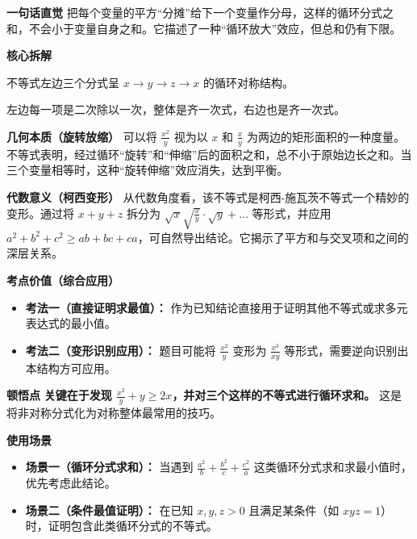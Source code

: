 \begin{explanationbox}
\textbf{\textcolor{CExplanation}{一句话直觉}}
把每个变量的平方“分摊”给下一个变量作分母，这样的循环分式之和，不会小于变量自身之和。它描述了一种“循环放大”效应，但总和仍有下限。

\medskip
\textbf{\textcolor{CExplanation}{核心拆解}}
\begin{description}[style=nextline, leftmargin=2.8em, labelsep=0.5em, itemsep=0.45em]
    \item[\textbf{要点一（结构对称）：}] 不等式左边三个分式呈 $x \to y \to z \to x$ 的循环对称结构。
    \item[\textbf{要点二（分式降幂）：}] 左边每一项是二次除以一次，整体是齐一次式，右边也是齐一次式。
\end{description}

\medskip
\textbf{\textcolor{CExplanation}{几何本质（旋转放缩）}}
可以将 $\frac{x^2}{y}$ 视为以 $x$ 和 $\frac{x}{y}$ 为两边的矩形面积的一种度量。不等式表明，经过循环“旋转”和“伸缩”后的面积之和，总不小于原始边长之和。当三个变量相等时，这种“旋转伸缩”效应消失，达到平衡。

\medskip
\textbf{\textcolor{CExplanation}{代数意义（柯西变形）}}
从代数角度看，该不等式是柯西-施瓦茨不等式一个精妙的变形。通过将 $x+y+z$ 拆分为 $\sqrt{x}\sqrt{\frac{x}{y}} \cdot \sqrt{y} + \dots$ 等形式，并应用 $a^2+b^2+c^2 \geq ab+bc+ca$，可自然导出结论。它揭示了平方和与交叉项和之间的深层关系。

\medskip
\textbf{\textcolor{CExplanation}{考点价值（综合应用）}}
\begin{itemize}[leftmargin=*, itemsep=0.5em, topsep=0.4em]
    \item \textbf{考法一（直接证明求最值）：} 作为已知结论直接用于证明其他不等式或求多元表达式的最小值。
    \item \textbf{考法二（变形识别应用）：} 题目可能将 $\frac{x^2}{y}$ 变形为 $\frac{x^3}{xy}$ 等形式，需要逆向识别出本结构方可应用。
\end{itemize}

\medskip
\textbf{\textcolor{CExplanation}{顿悟点}}
\textbf{关键在于发现 $\frac{x^2}{y} + y \geq 2x$，并对三个这样的不等式进行循环求和。} 这是将非对称分式化为对称整体最常用的技巧。

\medskip
\textbf{\textcolor{CExplanation}{使用场景}}
\begin{itemize}[leftmargin=*, itemsep=0.5em, topsep=0.4em]
    \item \textbf{场景一（循环分式求和）：} 当遇到 $\frac{a^2}{b}+\frac{b^2}{c}+\frac{c^2}{a}$ 这类循环分式求和求最小值时，优先考虑此结论。
    \item \textbf{场景二（条件最值证明）：} 在已知 $x,y,z>0$ 且满足某条件（如 $xyz=1$）时，证明包含此类循环分式的不等式。
\end{itemize}
\end{explanationbox}
